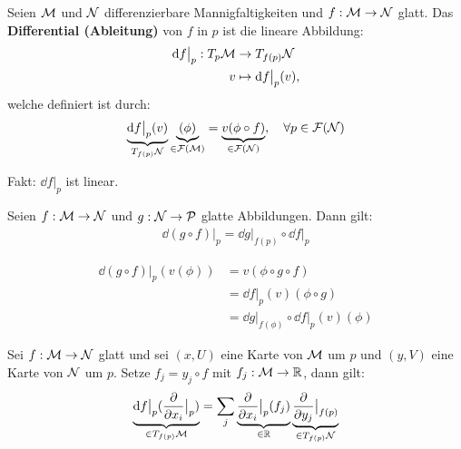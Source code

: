 \begin{defs}
Seien $\mathcal{M}$ und $\mathcal{N}$ differenzierbare Mannigfaltigkeiten und $f: \mathcal{M} \to \mathcal{N}$ glatt.
Das \textbf{Differential (Ableitung)} von $f$ in $p$ ist die lineare Abbildung:
\begin{align}
\dd f \big\vert_p : T_{p} \mathcal{M} &\to T_{f(p)}\mathcal{N} \\
v &\mapsto \dd f \big\vert_p (v),
\end{align}
welche definiert ist durch:
\begin{align}
\underbrace{\dd f \big\vert_p (v)}_{T_{f(p)}\mathcal{N}} \underbrace{(\phi)}_{\in \mathcal{F}(\mathcal{M})} = \underbrace{v(\phi \circ f)}_{\in \mathcal{F}(\mathcal{N})}, \quad \forall p \in \mathcal{F}(\mathcal{N})
\end{align}
\end{defs}
Fakt: $\dd f \big\vert_p$ ist linear.

\begin{satz}[Kettenregel]
\label{satz:Kettenregel}
Seien $f: \mathcal{M} \to \mathcal{N}$ und $g: \mathcal{N} \to \mathcal{P}$ glatte Abbildungen.
Dann gilt:
\begin{align}
\dd (g \circ f) \big\vert_p = \dd g \big\vert_{f(p)} \circ \dd f \big\vert_p
\end{align}
\end{satz}

\begin{bew} \leavevmode
\begin{align}
\dd (g \circ f) \big\vert_{p} (v (\phi)) &= v(\phi \circ g \circ f) \\
&= \dd f \big\vert_p (v)(\phi \circ g) \\
&= \dd g \big\vert_{f(\phi)} \circ \dd f \big\vert_p (v) (\phi)
\end{align}
\end{bew}

\begin{satz}
Sei $f: \mathcal{M} \to \mathcal{N}$ glatt und sei $(x, U)$ eine Karte von $\mathcal{M}$ um $p$ und $(y, V)$ eine Karte von $\mathcal{N}$ um $p$.
Setze $f_j = y_j \circ f$ mit $f_j : \mathcal{M} \to \mathbb{R}$, dann gilt:
\begin{align}
\underbrace{\dd f \big\vert_p ( \pdv{x_i} \big\vert_p)}_{\in T_{f(p)}\mathcal{M}} = \sum_j \underbrace{\pdv{x_i}\big\vert_p (f_j)}_{\in \mathbb{R}} \underbrace{\pdv{y_j} \big\vert_{f(p)}}_{\in T_{f(p)}\mathcal{N}}
\end{align}
\end{satz}


